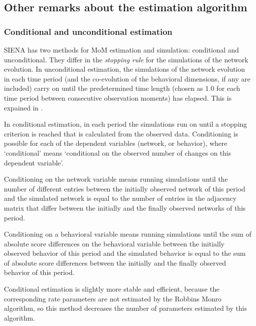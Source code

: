 \documentclass[a4paper,fleqn,11pt]{article}
\newcommand{\+}{\, + \,}
\newcommand{\SI}{{\sf SIENA }}
\begin{document}
\subsection{Other remarks about the estimation algorithm}

\subsubsection{Conditional and unconditional estimation}
\label{S_cond}

\SI has two methods for MoM estimation and simulation:
\hypertarget{T_S_cond}{conditional and unconditional}. They differ
in the {\em stopping rule} for the simulations of the network
evolution. In unconditional estimation, the simulations of the
network evolution in each time period (and the co-evolution of the
behavioral dimensions, if any are included) carry on until the
predetermined time length (chosen as 1.0
for each time period between consecutive observation moments) has elapsed.
This is expained in \citet[][Section 4.2]{Snijders01}.

In conditional estimation, in each period
the simulations run on until a stopping
criterion is reached that is calculated from the observed data.
Conditioning is possible for each of the dependent variables
(network, or behavior), where `conditional' means `conditional on
the observed number of changes on this dependent variable'.

Conditioning on the network variable means running simulations
until the number of different entries between the initially
observed network of this period and the simulated network
\hypertarget{T_distance_stop}{is equal to the number} of entries
in the adjacency matrix that differ between the initially and the
finally observed networks of this period.

Conditioning on a behavioral variable means running simulations
until the sum of absolute score differences on the behavioral
variable between the initially observed behavior of this period
and the simulated behavior is equal to the sum of absolute score
differences between the initially and the finally observed
behavior of this period.

Conditional estimation is slightly more stable and efficient,
because the corresponding rate parameters are not estimated by the
Robbins Monro algorithm, so this method decreases the number of
parameters estimated by this algorithm.
\medskip
\end{document}
